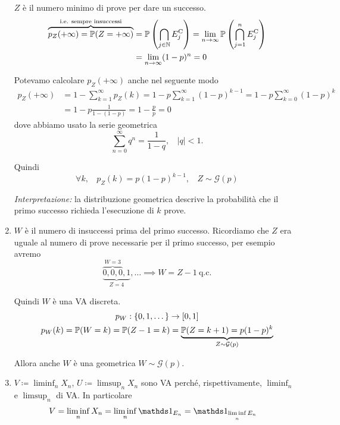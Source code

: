 \begin{enumerate}
$Z$ è il numero minimo di prove per dare un successo.\begin{align*}
\overbrace{p_{Z}( +\infty ) =\mathbb{P}( Z=+\infty )}^{\text{i.e. sempre insuccessi}} & =\mathbb{P}\left(\bigcap _{j\in \mathbb{N}} E_{j}^{\mathrm{C}}\right) =\lim _{n\rightarrow \infty }\mathbb{P}\left(\bigcap _{j=1}^{n} E_{j}^{\mathrm{C}}\right)\\
 & =\lim _{n\rightarrow \infty }( 1-p)^{n} =0
\end{align*}

\begin{oss}
Potevamo calcolare $p_{Z}( +\infty )$ anche nel seguente modo
\begin{align*}
p_{Z}( +\infty ) & =1-\sum\limits _{k=1}^{\infty } p_{Z}( k) =1-p\sum\limits _{k=1}^{\infty }( 1-p)^{k-1} =1-p\sum\limits _{k=0}^{\infty }( 1-p)^{k}\\
 & =1-p\frac{1}{1-( 1-p)} =1-\frac{p}{p} =0
\end{align*}
dove abbiamo usato la serie geometrica
\begin{equation*}
\sum\limits _{n=0}^{\infty } q^{n} =\frac{1}{1-q} ,\ \ \ \ | q| < 1.
\end{equation*}
\end{oss}

Quindi
\begin{equation*}
\forall k,\ \ \ \ p_{Z}( k) =p( 1-p)^{k-1} ,\ \ \ \ \boxed{Z\sim \mathcal{G}( p)}
\end{equation*}

\textit{Interpretazione:} la distribuzione geometrica descrive la probabilità che il primo successo richieda l'esecuzione di $k$ prove.
\item $W$ è il numero di insuccessi prima del primo successo. Ricordiamo che $Z$ era uguale al numero di prove necessarie per il primo successo, per esempio avremo
\begin{equation*}
\underbrace{\overbrace{0,0,0}^{W=3} ,1}_{Z=4} ,\dots \implies W=Z-1\ \text{q.c.}
\end{equation*}

Quindi $W$ è una VA discreta.\begin{gather*}
p_{W} :\{0,1,\dots \}\rightarrow [ 0,1]\\
p_{W}( k) =\mathbb{P}( W=k) =\mathbb{P}( Z-1=k) =\underbrace{\mathbb{P}( Z=k+1) =p( 1-p)^{k}}_{Z\sim \mathcal{G}( p)}
\end{gather*}

Allora anche $W$ è una geometrica $W\sim \mathcal{G}( p)$.
\item $V\coloneqq \liminf _{n} X_{n}$, $U\coloneqq \limsup _{n} X_{n}$ sono VA perché, rispettivamente, $\liminf _{n}$ e $\limsup _{n}$ di VA. In particolare
\begin{align*}
V & =\liminf _{n} X_{n} =\liminf _{n}\Ind_{E_{n}} =\Ind_{\liminf\limits _{n} E_{n}}
\end{align*}


\end{enumerate}
